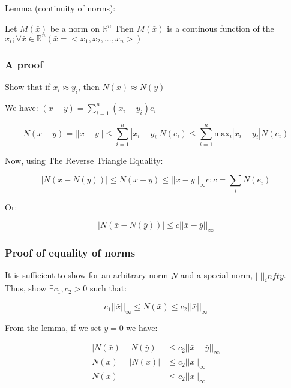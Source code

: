 Lemma (continuity of norms):

Let $M(\bar{x})$ be a norm on $\mathbb{R}^n$ Then $M(\bar{x})$ is a continous function of the $x_i; \forall \bar{x} \in \mathbb{R}^n (\bar{x} = <x_1, x_2, ..., x_n>)$

\subsubsection{A proof}

Show that if $x_i \approx y_i$, then $N(\bar{x}) \approx N(\bar{y})$

We have: $(\bar{x} - \bar{y}) = \sum_{i=1}^{n} (x_i - y_i) e_i$

\begin{equation}
  N(\bar{x} - \bar{y}) = ||\bar{x} - \bar{y}|| \leq \sum_{i=1}^{n} |x_i - y_i| N(e_i) \leq \sum_{i=1}^{n} \text{max}_i |x_i - y_i| N(e_i)
\end{equation}

Now, using The Reverse Triangle Equality:

\begin{equation}
  |N(\bar{x} - N(\bar{y}))| \leq N(\bar{x} - \bar{y}) \leq ||\bar{x} - \bar{y}||_\infty c; c = \sum_i N(e_i)
\end{equation}

Or:

\begin{equation}
  |N(\bar{x} - N(\bar{y}))| \leq c ||\bar{x} - \bar{y}||_\infty
\end{equation}

\subsubsection{Proof of equality of norms}

It is sufficient to show for an arbitrary norm $N$ and a special norm, $||\dot||_infty$. Thus, show $\exists c_1, c_2 > 0$ such that:

\begin{equation}
  c_1 ||\bar{x}||_\infty \leq N(\bar{x}) \leq c_2 ||\bar{x}||_\infty
\end{equation}

From the lemma, if we set $\bar{y} = 0$ we have:

\begin{align*}
  |N(\bar{x}) - N(\bar{y})  & \leq c_2 ||\bar{x} - \bar{y}||_\infty \\
  N(\bar{x}) = |N(\bar{x})| & \leq c_2 ||\bar{x}||_\infty \\
  N(\bar{x})                & \leq c_2 ||\bar{x}||_\infty
\end{align*}

